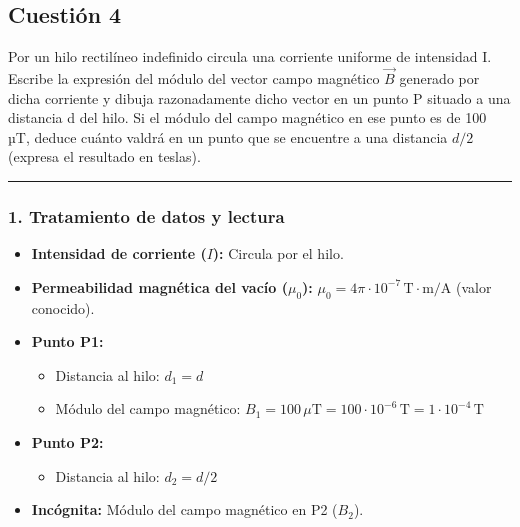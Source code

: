 \newpage

\subsection{Cuestión 4}
\label{subsec:C4_2022_jun_ord}

\begin{cajaenunciado}
Por un hilo rectilíneo indefinido circula una corriente uniforme de intensidad I. Escribe la expresión del módulo del vector campo magnético $\vec{B}$ generado por dicha corriente y dibuja razonadamente dicho vector en un punto P situado a una distancia d del hilo. Si el módulo del campo magnético en ese punto es de 100 µT, deduce cuánto valdrá en un punto que se encuentre a una distancia $d/2$ (expresa el resultado en teslas). 
\end{cajaenunciado}
\hrule

\subsubsection*{1. Tratamiento de datos y lectura}
\begin{itemize}
    \item \textbf{Intensidad de corriente ($I$):} Circula por el hilo.
    \item \textbf{Permeabilidad magnética del vacío ($\mu_0$):} $\mu_0 = 4\pi \cdot 10^{-7} \, \text{T}\cdot\text{m}/\text{A}$ (valor conocido).
    \item \textbf{Punto P1:}
        \begin{itemize}
            \item Distancia al hilo: $d_1 = d$
            \item Módulo del campo magnético: $B_1 = 100 \, \mu\text{T} = 100 \cdot 10^{-6} \, \text{T} = 1 \cdot 10^{-4} \, \text{T}$
        \end{itemize}
    \item \textbf{Punto P2:}
        \begin{itemize}
            \item Distancia al hilo: $d_2 = d/2$
        \end{itemize}
    \item \textbf{Incógnita:} Módulo del campo magnético en P2 ($B_2$).
\end{itemize}

